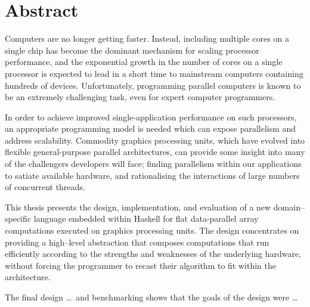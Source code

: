 
\chapter{Abstract}

Computers are no longer getting faster. Instead, including multiple cores on a
single chip has become the dominant mechanism for scaling processor performance,
and the exponential growth in the number of cores on a single processor is
expected to lead in a short time to mainstream computers containing hundreds of
devices. Unfortunately, programming parallel computers is known to be an
extremely challenging task, even for expert computer programmers.

In order to achieve improved single-application performance on such processors,
an appropriate programming model is needed which can expose parallelism and
address scalability. Commodity graphics processing units, which have evolved
into flexible general-purpose parallel architectures, can provide some insight
into many of the challengers developers will face; finding parallelism within
our applications to satiate available hardware, and rationalising the
interactions of large numbers of concurrent threads.

This thesis presents the design, implementation, and evaluation of a new
domain--specific language embedded within Haskell for flat data-parallel array
computations executed on graphics processing units. The design concentrates on
providing a high--level abstraction that composes computations that run
efficiently according to the strengths and weaknesses of the underlying
hardware, without forcing the programmer to recast their algorithm to fit within
the architecture.

The final design \ldots\ and benchmarking shows that the goals of the design were
\ldots

